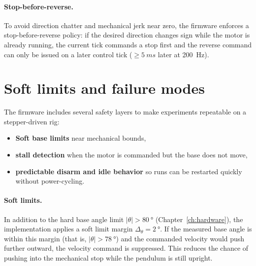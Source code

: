 \paragraph{Stop-before-reverse.}
To avoid direction chatter and mechanical jerk near zero, the firmware enforces a stop-before-reverse policy: if the desired direction changes sign while the motor is already running, the current tick commands a stop first and the reverse command can only be issued on a later control tick ($\ge\SI{5}{ms}$ later at \SI{200}{Hz}).

\section{Soft limits and failure modes}
The firmware includes several safety layers to make experiments repeatable on a stepper-driven rig:
\begin{itemize}
  \item \textbf{Soft base limits} near mechanical bounds,
  \item \textbf{stall detection} when the motor is commanded but the base does not move,
  \item \textbf{predictable disarm and idle behavior} so runs can be restarted quickly without power-cycling.
\end{itemize}

\paragraph{Soft limits.}
In addition to the hard base angle limit $|\theta|>\SI{80}{\degree}$ (Chapter~\ref{ch:hardware}), the implementation applies a soft limit margin $\Delta_\theta=\SI{2}{\degree}$. If the measured base angle is within this margin (that is, $|\theta|>\SI{78}{\degree}$) and the commanded velocity would push further outward, the velocity command is suppressed. This reduces the chance of pushing into the mechanical stop while the pendulum is still upright.

